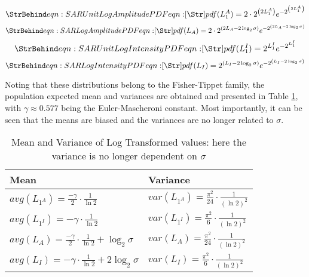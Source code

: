 \begin{equation}
  \label{eqn:SAR Unit Log Amplitude PDF}
  \caption{eqn:SAR Unit Log Amplitude PDF}
pdf(L_{1}^{A}) = 2 \cdot 2^{\left( 2 L_{1}^{A} \right)}e^{-2^{\left( 2 L_{1}^{A} \right) }} 
\end{equation}
\begin{equation}
  \label{eqn:SAR Log Amplitude PDF}
  \caption{eqn:SAR Log Amplitude PDF}
pdf(L_A) = 2 \cdot 2^{\left( 2 L_A - 2 \log_2 \sigma \right)}e^{-2^{\left( 2 L_A - 2 \log_2 \sigma \right)}} 
\end{equation}
\begin{equation}
  \label{eqn:SAR Unit Log Intensity PDF}
  \caption{eqn:SAR Unit Log Intensity PDF}
pdf(L_{1}^{I}) = 2^{L_1^I} e^{-2^{L_1^I}}  
\end{equation}
\begin{equation}
  \label{eqn:SAR Log Intensity PDF}
  \caption{eqn:SAR Log Intensity PDF}
pdf(L_I) = 2^{\left( L_I - 2 \log_2 \sigma \right)} e^{-2^{\left( L_I - 2 \log_2 \sigma \right)} }  
\end{equation}

Noting that these distributions belong to the Fisher-Tippet family, the population expected mean and variances 
are obtained and presented in Table \ref{tbl:sar_log_domain_avg_var}, with $\gamma \approx 0.577$ being the Euler-Mascheroni constant. 
Most importantly, it can be seen that the means are biased and the variances are no longer related to $\sigma$. 

\begin{table}[h]
\normalsize
\centering

\begin{tabular}{|l|l|}
\hline
Mean & Variance \\
\hline
$avg(L_{1^A}) = \frac{ - \gamma }{2} \cdot \frac{1}{\ln2}$ & $var(L_{1^A}) = \frac{ \pi ^2}{24} \cdot \frac{1}{(\ln2)^2}$ \\
$avg(L_{1^I}) = - \gamma \cdot \frac{1}{\ln2} $ & $var(L_{1^I}) = \frac{ \pi ^2}{6} \cdot \frac{1}{(\ln2)^2} $ \\
$avg(L_A) = \frac{ - \gamma }{2} \cdot \frac{1}{\ln2} + \log_2{\sigma}$ & $var(L_A) = \frac{ \pi ^2}{24} \cdot \frac{1}{(\ln2)^2}$ \\
$avg(L_I) = - \gamma \cdot \frac{1}{\ln2} + 2 \log_2{\sigma}  $ & $ var(L_I) = \frac{ \pi ^2}{6} \cdot \frac{1}{(\ln2)^2}$ \\
\hline
\end{tabular}

\caption{ Mean and Variance of Log Transformed values: here the variance is no longer dependent on $\sigma$ }
\label{tbl:sar_log_domain_avg_var}
\end{table}

